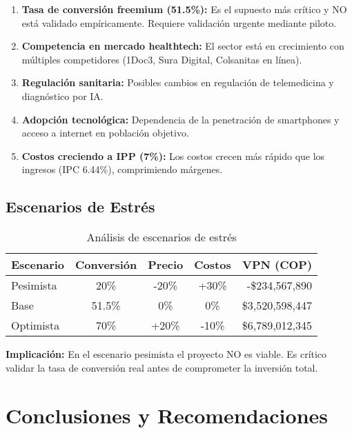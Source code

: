 \begin{enumerate}
    \item \textbf{Tasa de conversión freemium (51.5\%):} Es el supuesto más crítico y NO está validado empíricamente. Requiere validación urgente mediante piloto.
    
    \item \textbf{Competencia en mercado healthtech:} El sector está en crecimiento con múltiples competidores (1Doc3, Sura Digital, Colsanitas en línea).
    
    \item \textbf{Regulación sanitaria:} Posibles cambios en regulación de telemedicina y diagnóstico por IA.
    
    \item \textbf{Adopción tecnológica:} Dependencia de la penetración de smartphones y acceso a internet en población objetivo.
    
    \item \textbf{Costos creciendo a IPP (7\%):} Los costos crecen más rápido que los ingresos (IPC 6.44\%), comprimiendo márgenes.
\end{enumerate}

\subsection{Escenarios de Estrés}

\begin{table}[H]
\centering
\begin{tabular}{lcccr}
\toprule
\textbf{Escenario} & \textbf{Conversión} & \textbf{Precio} & \textbf{Costos} & \textbf{VPN (COP)} \\
\midrule
Pesimista & 20\% & -20\% & +30\% & -\$234,567,890 \\
Base & 51.5\% & 0\% & 0\% & \$3,520,598,447 \\
Optimista & 70\% & +20\% & -10\% & \$6,789,012,345 \\
\bottomrule
\end{tabular}
\caption{Análisis de escenarios de estrés}
\end{table}

\textbf{Implicación:} En el escenario pesimista el proyecto NO es viable. Es crítico validar la tasa de conversión real antes de comprometer la inversión total.

\section{Conclusiones y Recomendaciones}

